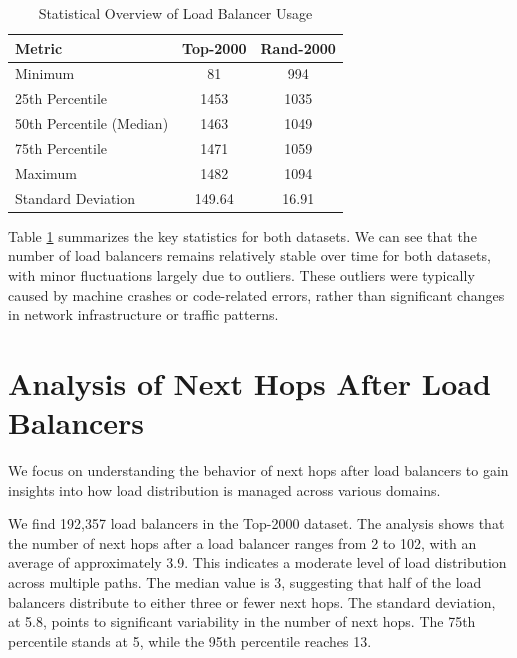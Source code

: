 \documentclass[12pt]{cwru_thesis}
\begin{document}
\begin{table}[h]
\centering
\begin{tabular}{|l|c|c|}
\hline
\textbf{Metric} & \textbf{Top-2000} & \textbf{Rand-2000} \\
\hline
Minimum & 81 & 994 \\
\hline
25th Percentile & 1453 & 1035 \\
\hline
50th Percentile (Median) & 1463 & 1049 \\
\hline
75th Percentile  & 1471 & 1059 \\
\hline
Maximum & 1482 & 1094 \\
\hline
Standard Deviation & 149.64 & 16.91 \\
\hline
\end{tabular}
\caption{Statistical Overview of Load Balancer Usage}
\label{tab:stats_overview}
\end{table}

Table \ref{tab:stats_overview} summarizes the key statistics for both datasets. We can see that the number of load balancers remains relatively stable over time for both datasets, with minor fluctuations largely due to outliers. These outliers were typically caused by machine crashes or code-related errors, rather than significant changes in network infrastructure or traffic patterns.













\section{Analysis of Next Hops After Load Balancers}

We focus on understanding the behavior of next hops after load balancers to gain insights into how load distribution is managed across various domains. 

We find 192,357 load balancers in the Top-2000 dataset. The analysis shows that the number of next hops after a load balancer ranges from 2 to 102, with an average of approximately 3.9. This indicates a moderate level of load distribution across multiple paths. The median value is 3, suggesting that half of the load balancers distribute to either three or fewer next hops. The standard deviation, at 5.8, points to significant variability in the number of next hops. The 75th percentile stands at 5, while the 95th percentile reaches 13.
\end{document}
